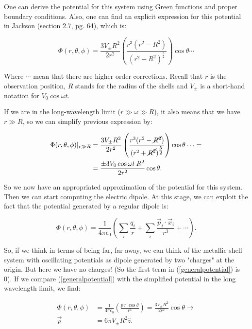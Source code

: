 One can derive the potential for this system using Green functions and proper boundary conditions. Also, one can find an explicit expression for this potential in Jackson (section 2.7, pg. 64), which is:

\begin{equation}
	\Phi (r, \theta, \phi) = \frac{3 V_{\pm} R^{2}}{2 r^{2}} \left(\frac{r^{3}(r^{2}-R^{2})}{(r^{2} + R^{2})^{\tfrac{5}{2}}}\right)\cos\theta \cdots
\end{equation}

Where $\cdots$ mean that there are higher order corrections. Recall that $r$ is the observation position, $R$ stands for the radius of the shells and $V_{\pm}$ is a short-hand notation for $V_{0}\cos \omega t$.

If we are in the long-wavelength limit ($r\gg \omega \gg R$), it also means that we have $r\gg R$, so we can simplify previous expression by:

\begin{equation}
	\begin{split}
		\Phi (r, \theta, \phi)|_{r\gg R} &= \frac{3 V_{\pm} R^{2}}{2 r^{2}} \left(\frac{r^{3}(r^{2}-\cancel{R^{2}})}{(r^{2} + \cancel{R^{2}})^{\tfrac{5}{2}}}\right)\cos\theta \cdots =\\
		&= \frac{\pm 3 V_{0} \cos \omega t \: R^{2}}{2 r^{2}}\cos \theta.
	\end{split}
\end{equation}

So we now have an appropriated approximation of the potential for this system. Then we can start computing the electric dipole.  At this stage, we can exploit the fact that the potential generated by a regular dipole is:

\begin{equation}\label{generalpotential}
	\Phi (r, \theta, \phi) = \frac{1}{4\pi \epsilon_{0}} \left(\sum_{i} \frac{q_{i}}{r} + \sum_{i} \frac{\vec{p}_{i}\cdot \vec{x}_{i}}{r^{3} } +\cdots \right).
\end{equation}

So, if we think in terms of being far, far away, we can think of the metallic shell system with oscillating potentials as dipole generated by two "charges" at the origin. But here we have no charges! (So the first term in (\ref{generalpotential}) is 0). If we compare (\ref{generalpotential}) with the simplified potential in the long wavelength limit, we find:

\begin{equation}
	\begin{split}
		\Phi (r, \theta, \phi) &= \frac{1}{4\pi \epsilon_{0}} \left( \frac{p \: r \: \cos \theta}{r^{3}}\right) = \frac{3 V_{\pm} R^{2}}{2 r^{2}} \cos \theta \rightarrow \\
		\vec{p} &= 6 \pi V_{\pm} R^{2} \hat{z}.
	\end{split}
\end{equation}

